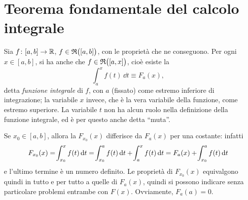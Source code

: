 \section{Teorema fondamentale del calcolo integrale}
\begin{definizione} \label{d:f-integrale}
Sia $f\colon[a,b]\to\mathbb{R}$, $f\in\mathfrak{R}\big([a,b]\big)$, con le proprietà che ne conseguono. Per ogni $x\in[a,b]$, si ha anche che $f\in\mathfrak{R}\big([a,x]\big)$, cioè esiste la
\[
\int_a^xf(t)\,\dd t\equiv F_a(x),
\]
detta \emph{funzione integrale} di $f$, con $a$ (fissato) come estremo inferiore di integrazione; la variabile $x$ invece, che è la vera variabile della funzione, come estremo superiore. La variabile $t$ non ha alcun ruolo nella definizione della funzione integrale, ed è per questo anche detta ``muta''.
\end{definizione}
Se $x_0\in[a,b]$, allora la $F_{x_0}(x)$ differisce da $F_a(x)$ per una costante: infatti
\[
F_{x_0}(x)=\!\int_{x_0}^xf(t)\,\textup{d} t=\!\int_{x_0}^af(t)\,\textup{d} t+\!\int_a^xf(t)\,\textup{d} t=F_a(x)+\!\int_{x_0}^af(t)\,\textup{d} t
\]
e l'ultimo termine è un numero definito.
Le proprietà di $F_{x_0}(x)$ equivalgono quindi in tutto e per tutto a quelle di $F_a(x)$, quindi si possono indicare senza particolare problemi entrambe con $F(x)$.
Ovviamente, $F_a(a)=0$.

